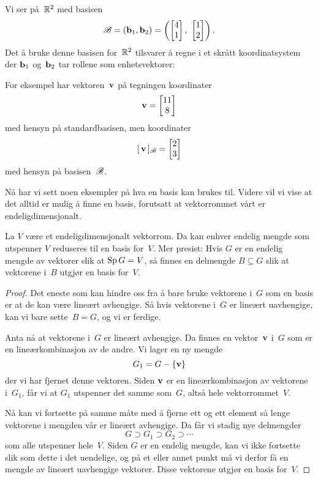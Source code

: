 \begin{ex}
Vi ser på~$\mathbb{R}^2$ med basisen
\[
\mathscr{B}
 = (\mathbf{b}_1, \mathbf{b}_2)
 = \left( \begin{bmatrix} 4 \\ 1 \end{bmatrix},\ \begin{bmatrix} 1 \\ 2 \end{bmatrix} \right).
\]
Det å bruke denne basisen for~$\mathbb{R}^2$ tilsvarer å regne i et skrått
koordinatsystem der $\mathbf{b}_1$ og~$\mathbf{b}_2$ tar rollene som enhetsvektorer:
\begin{center}
\end{center}
For eksempel har vektoren~$\mathbf{v}$ på tegningen koordinater
\[
\mathbf{v} = \begin{bmatrix} 11 \\ 8 \end{bmatrix}
\]
med hensyn på standardbasisen, men koordinater
\[
[\,{\mathbf{v}}\,]_{\mathscr{B}} = \begin{bmatrix} 2 \\ 3 \end{bmatrix}
\]
med hensyn på basisen~$\mathscr{B}$.
\end{ex}

Nå har vi sett noen eksempler på hva en basis kan brukes til.  Videre
vil vi vise at det alltid er mulig å finne en basis, forutsatt at
vektorrommet vårt er endeligdimensjonalt.

\begin{thm}
La $V$ være et endeligdimensjonalt vektorrom.  Da kan enhver endelig
mengde som utspenner $V$ reduseres til en basis for~$V$.  Mer presist:
Hvis $G$ er en endelig mengde av vektorer slik at $\operatorname{Sp} G = V$, så
finnes en delmengde $B \subseteq G$ slik at vektorene i~$B$ utgjør en
basis for~$V$.
\end{thm}
\begin{proof}
Det eneste som kan hindre oss fra å bare bruke vektorene i~$G$ som en
basis er at de kan være lineært avhengige.  Så hvis vektorene i~$G$ er
lineært uavhengige, kan vi bare sette~$B = G$, og vi er ferdige.

Anta nå at vektorene i~$G$ er lineært avhengige.  Da finnes en
vektor~$\mathbf{v}$ i~$G$ som er en lineærkombinasjon av de andre.  Vi lager
en ny mengde
\[
G_1 = G - \{ \mathbf{v} \}
\]
der vi har fjernet denne vektoren.  Siden $\mathbf{v}$ er en lineærkombinasjon
av vektorene i~$G_1$, får vi at $G_1$ utspenner det samme som~$G$,
altså hele vektorrommet~$V$.

Nå kan vi fortsette på samme måte med å fjerne ett og ett element så
lenge vektorene i mengden vår er lineært avhengige.  Da får vi stadig
nye delmengder
\[
G \supset G_1 \supset G_2 \supset \cdots%
\]
som alle utspenner hele~$V$.  Siden $G$ er en endelig mengde, kan vi
ikke fortsette slik som dette i det uendelige, og på et eller annet
punkt må vi derfor få en mengde av lineært uavhengige vektorer.  Disse
vektorene utgjør en basis for~$V$.
\end{proof}


